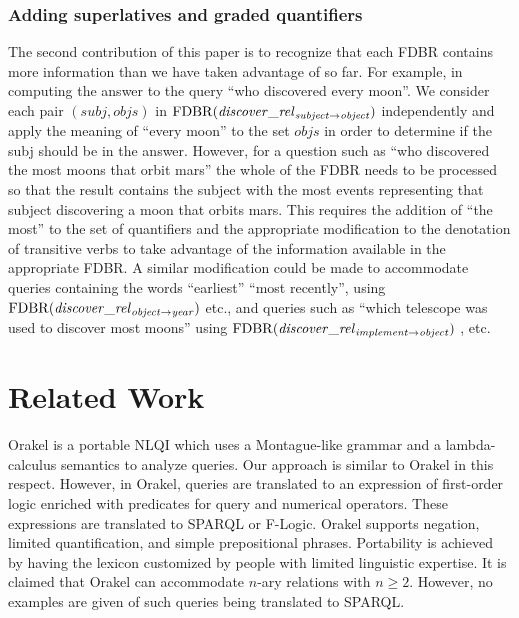 \documentclass[../main.tex]{subfiles}
\begin{document}
\begin{refsection}
\subsubsection{Adding superlatives and graded quantifiers}
The second contribution of this paper is to recognize that each FDBR contains more information than we
have taken advantage of so far. For example, in computing the answer to the query ``who discovered
every moon''. We consider each pair $(\mathit{subj}, \mathit{objs})$ in $\mathrm{FDBR}({\mathit{\mathit{discover}\_rel}_{\mathit{subject}\rightarrow\mathit{object}}})$
independently and apply the meaning of ``every moon'' to the set $\mathit{objs}$ in order to determine if the
subj should be in the answer. However, for a question such as ``who discovered the most moons that
orbit mars'' the whole of the FDBR needs to be processed so that the result contains the subject with
the most events representing that subject discovering a moon that orbits mars. This requires the
addition of ``the most'' to the set of quantifiers and the appropriate modification to the denotation of
transitive verbs to take advantage of the information available in the appropriate FDBR. A similar
modification could be made to accommodate queries containing the words ``earliest'' ``most recently'', using $\mathrm{FDBR}({\mathit{\mathit{discover}\_rel}_{\mathit{object}\rightarrow\mathit{year}}})$ etc., and queries such as ``which telescope was used to discover most
moons'' using $\mathrm{FDBR}({\mathit{\mathit{discover}\_rel}_{\mathit{implement}\rightarrow\mathit{object}}})$ , etc.

\section{Related Work}
\label{ext:relatedwork}
Orakel \cite{cimiano:haase} is a portable NLQI which uses a Montague-like grammar and a lambda-calculus semantics to analyze queries. Our approach is similar to Orakel in this respect. However, in Orakel, queries are translated to an expression of first-order logic enriched with predicates for query and numerical operators. These expressions are translated to SPARQL or F-Logic. Orakel supports negation, limited quantification, and simple prepositional phrases. Portability is achieved by having the lexicon customized by people with limited linguistic expertise. It is claimed that Orakel can accommodate $n$-ary relations with $n \geq 2$. However, no examples are given of such queries being translated to SPARQL.


\end{refsection}
\end{document}
